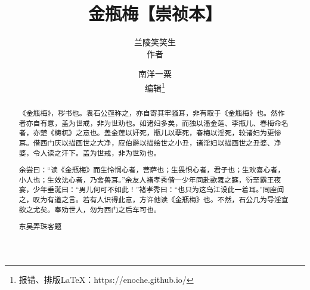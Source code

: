 \documentclass[lang=cn,10pt,a5paper]{elegantpaper}
\title{金瓶梅【崇祯本】}
\author{兰陵笑笑生 \\ 作者 \and 南洋一粟 \\ 编辑\footnote{报错、排版\LaTeX{}：https://enoche.github.io/}}
\date{}
\begin{document}

\maketitle
\thispagestyle{empty}


\newpage

\begin{abstract}
\thispagestyle{empty}
\indent 《金瓶梅》，秽书也。袁石公亟称之，亦自寄其牢骚耳，非有取于《金瓶梅》也。然作者亦自有意，盖为世戒，非为世劝也。如诸妇多矣，而独以潘金莲、李瓶儿、春梅命名者，亦楚《梼杌》之意也。盖金莲以奸死，瓶儿以孽死，春梅以淫死，较诸妇为更惨耳。借西门庆以描画世之大净，应伯爵以描绘世之小丑，诸淫妇以描画世之丑婆、净婆，令人读之汗下。盖为世戒，非为世劝也。

余尝曰：“读《金瓶梅》而生怜悯心者，菩萨也；生畏惧心者，君子也；生欢喜心者，小人也；生效法心者，乃禽兽耳。”余友人褚孝秀偕一少年同赴歌舞之筵，衍至霸王夜宴，少年垂涎曰：“男儿何可不如此！”褚孝秀曰：“也只为这乌江设此一着耳。”同座闻之，叹为有道之言。若有人识得此意，方许他读《金瓶梅》也。不然，石公几为导淫宣欲之尤矣。奉劝世人，勿为西门之后车可也。

\bigskip\mbox{}\large\hfill 东吴弄珠客题
\end{abstract}
\newpage
\end{document}
